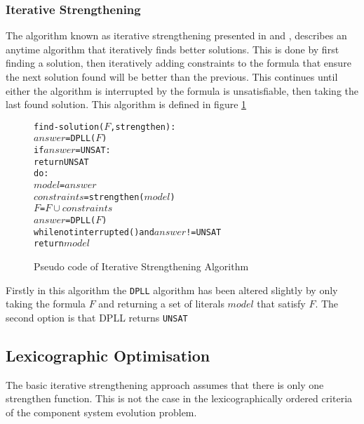 \subsubsection{Iterative Strengthening}
The algorithm known as iterative strengthening presented in \cite{calistri1994iterative} and \cite{le2010sat4j}, 
describes an anytime algorithm that iteratively finds better solutions.
This is done by first finding a solution, then iteratively adding constraints to the formula that ensure the next solution found will be better than the previous.
This continues until either the algorithm is interrupted by the formula is unsatisfiable, then taking the last found solution. 
This algorithm is defined in figure \ref{impl.strength}

\begin{figure}[htp]
\begin{center}
\begin{alltt}
find-solution(\(F\),strengthen):
    \(answer\) = DPLL(\(F\))
    if \(answer\) = UNSAT:
        return UNSAT
    do:
        \(model\) = \(answer\)
        \(constraints\) = strengthen(\(model\))
        \(F\) = \(F \cup constraints\)
        \(answer\) = DPLL(\(F\))
    while not interrupted() and \(answer\) != UNSAT
    return \(model\) 
\end{alltt}
  \caption{Pseudo code of Iterative Strengthening Algorithm}
  \label{impl.strength}
\end{center}
\end{figure}

Firstly in this algorithm the \verb+DPLL+ algorithm has been altered slightly by only taking the formula $F$ and returning a set of literals $model$ that satisfy $F$.
The second option is that DPLL returns \verb+UNSAT+

\subsection{Lexicographic Optimisation}
The basic iterative strengthening approach assumes that there is only one strengthen function.
This is not the case in the lexicographically ordered criteria of the component system evolution problem.

